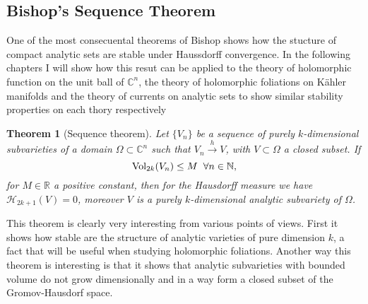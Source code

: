 \documentclass[12pt,twoside,a4paper]{report}
\newtheorem{theorem}{Theorem}[section]
\newcommand{\nat}{\ensuremath{ \mathbb N }}
\newcommand{\re}{\ensuremath{\mathbb R }}
\newcommand{\con}{\ensuremath{\mathbb{C}^n}}
\newcommand{\om}{\ensuremath{\Omega}}
\begin{document}
\subsection{Bishop's Sequence Theorem}
\noindent One of the most consecuental theorems of Bishop shows how the stucture of compact analytic sets are stable under Haussdorff convergence. In the following chapters I will show how this resut can be applied to the theory of holomorphic function on the unit ball of $\con$, the theory of holomorphic foliations on Kähler manifolds and the theory of currents on analytic sets to show similar stability properties on each thory respectively

\begin{theorem}[Sequence theorem] \label{bishop sequence}
  Let $\lbrace V_n\rbrace$ be a sequence of purely $k$-dimensional subvarieties of a domain $\om\subset\con$ such that $V_n\overset{h}\rightarrow V$, with $V\subset\om$ a closed subset. If
  \[
    \textrm{Vol}_{2k}(V_n)\leq M \hspace*{0.2cm}\forall n\in\nat,
  \]
  for $M\in\re$ a positive constant, then for the Hausdorff measure we have $\mathcal{H}_{2k+1}(V)=0$, moreover $V$ is a purely $k$-dimensional analytic subvariety of $\om$.
\end{theorem}

This theorem is clearly very interesting from various points of views. First it shows how stable are the structure of analytic varieties of pure dimension $k$, a fact that will be useful when studying holomorphic foliations. Another way this theorem is interesting is that it shows that analytic subvarieties with bounded volume do not grow dimensionally and in a way form a closed subset of the Gromov-Hausdorf space.
\end{document}
